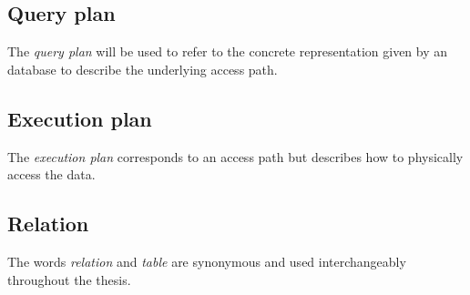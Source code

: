 \subsection*{Query plan}
The \textit{query plan} will be used to refer to the concrete representation
given by an database to describe the underlying access path.

\subsection*{Execution plan}
The \textit{execution plan} corresponds to an access path but describes how to
physically access the data.

\subsection*{Relation}
The words \textit{relation} and \textit{table} are synonymous and used
interchangeably throughout the thesis.
